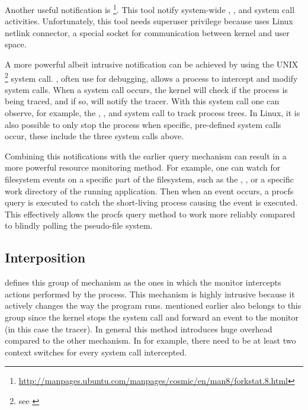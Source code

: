 Another useful notification is \footnote{\href{http://manpages.ubuntu.com/manpages/cosmic/en/man8/forkstat.8.html}{http://manpages.ubuntu.com/manpages/cosmic/en/man8/forkstat.8.html}}.
This tool notify system-wide , , and  system call activities.
Unfortunately, this tool needs superuser privilege because uses Linux netlink connector, a special socket for communication between kernel and user space.

A more powerful albeit intrusive notification can be achieved by using the UNIX \footnote{see \href{https://linux.die.net/man/2/ptrace}{}} system call.
, often use for debugging, allows a process to intercept and modify system calls.
When a system call occurs, the kernel will check if the process is being traced, and if so, will notify the tracer.
With this system call one can observe, for example, the , , and  system call to track process trees.
In Linux, it is also possible to only stop the process when specific, pre-defined system calls occur, these include the three system calls above.

Combining this notifications with the earlier query mechanism can result in a more powerful resource monitoring method.
For example, one can watch for filesystem events on a specific part of the filesystem, such as the , , or a specific work directory of the running application. Then when an event occurs, a procfs query is executed to catch the short-living process causing the event is executed.
This effectively allows the procfs query method to work more reliably compared to blindly polling the pseudo-file system.

\subsection{Interposition}

\citet{juvePracticalResourceMonitoring2015} defines this group of mechanism as the ones in which the monitor intercepts actions performed by the process.
This mechanism is highly intrusive because it actively changes the way the program runs.
 mentioned earlier also belongs to this group since the kernel stops the system call and forward an event to the monitor (in this case the tracer).
In general this method introduces huge overhead compared to the other mechanism.
In  for example, there need to be at least two context switches for every system call intercepted.

